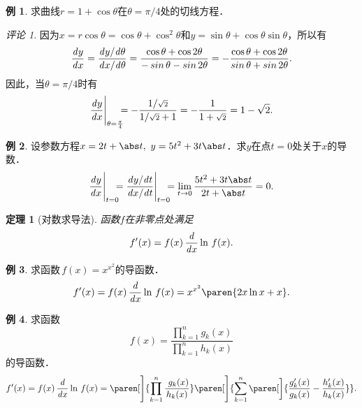 \documentclass[a4paper,punct=CCT]{ctexbook}
\newtheorem*{theorem*}{定理}
\theoremstyle{definition}
\newtheorem*{example*}{例}
\theoremstyle{remark}
\newtheorem*{remark}{评论}
\begin{document}
\begin{example*}
  求曲线\(r = 1 + \cos\theta\)在\(\theta = \pi/4\)处的切线方程．

  \begin{remark}
    因为\(x = r \cos\theta = \cos\theta + \cos^2\theta\)和\(y = \sin\theta + \cos\theta \sin\theta\)，所以有
    \begin{equation*}
      \dydx
      = \frac{\dy/\!\dtheta}{\dx/\!\dtheta}
      = \frac{\cos\theta + \cos2\theta}{-\sin\theta - \sin2\theta}
      = - \frac{\cos\theta + \cos2\theta}{\sin\theta + \sin2\theta}.
    \end{equation*}
    因此，当\(\theta = \pi/4\)时有
    \begin{equation*}
      \frac{\mathop{}\!\mathit{d} y}{\mathop{}\!\mathit{d} x}\Bigg\vert_{\theta=\frac\pi4} \mkern-11mu
      = - \frac{1/{\scriptstyle\sqrt2}}{1/{\scriptstyle\sqrt2} + 1}
      = - \frac{1}{1 + {\scriptstyle\sqrt2}}
      = 1 - \sqrt2.
    \end{equation*}
  \end{remark}
\end{example*}

\begin{example*}
  设参数方程\(x = 2t + \abs t,\ y = 5t^2 + 3t\abs t\)．求\(y\)在点\(t = 0\)处关于\(x\)的导数．
  \begin{equation*}
    \dydx\Bigg\vert_{t=0} \mkern-11mu
    = \frac{\dy/\!\dt}{\dx/\!\dt} \Bigg\vert_{t=0} \mkern-11mu
    = \lim_{t\to0} \frac{5t^2 + 3t\abs t}{2t + \abs t}
    = 0.
  \end{equation*}
\end{example*}

\begin{theorem*}[对数求导法]
  函数\(f\)在非零点处满足
  \begin{equation*}
    f'(x) = f(x) \,\frac{\mathop{}\!\mathit{d}}{\mathop{}\!\mathit{d} x} \ln\,f(x).
  \end{equation*}
\end{theorem*}

\begin{example*}
  求函数\(\,f(x) = x^{x^2}\)的导函数．
  \begin{equation*}
    f'(x)
    = f(x) \,\ddx \ln\,f(x)
    = x^{x^2} \paren{2x\ln x + x}.
  \end{equation*}
\end{example*}

\begin{example*}
  求函数
  \begin{equation*}
    f(x) = \frac{\prod\limits_{k=1}^n g_k(x)}{\prod\limits_{k=1}^n h_k(x)}
  \end{equation*}
  的导函数．
  \begin{equation*}
    f'(x)
    = f(x) \,\ddx \ln\,f(x)
    = \paren[\Bigg]{\prod_{k=1}^n \frac{\ g_k(x)}{h_k(x)}}
    \paren[\Bigg]{\sum_{k=1}^n \paren[\bigg]{\frac{g_k'(x)}{g_k(x)} - \frac{h_k'(x)}{h_k(x)}}}.
  \end{equation*}
\end{example*}
\end{document}

